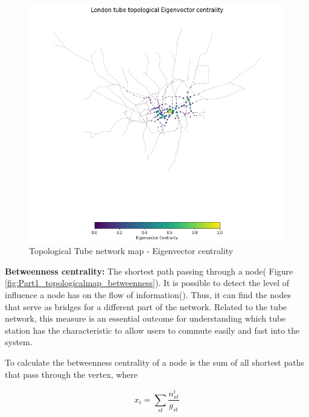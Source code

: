\documentclass[10pt]{report}
\numberwithin{figure}{section}
\numberwithin{table}{section}
\begin{document}
        
    \begin{figure}[htp]
        \centering
        \includegraphics[width=14cm]{Image/Part1_topologicalmap_eigenvector.png}
        \caption{Topological Tube network map - Eigenvector centrality}
        \label{fig:Part1_topologicalmap_eigenvector}
    \end{figure} 

  
\newpage   
        \textbf{Betweenness centrality:} The shortest path passing through a node( Figure \ref{fig:Part1_topologicalmap_betweenness}). It is possible to detect the level of influence a node has on the flow of information(\cite{arcaute_review_2022}). Thus, it can find the nodes that serve as bridges for a different part of the network. Related to the tube network, this measure is an essential outcome for understanding which tube station has the characteristic to allow users to commute easily and fast into the system.
        
        To calculate the betweenness centrality of a node is the sum of all shortest paths that pass through the vertex, where 
                    

\begin{equation}x_{i}=\sum_{st} \frac {n^{i}_{st}}{g_{st}}\end{equation}
        
\end{document}
